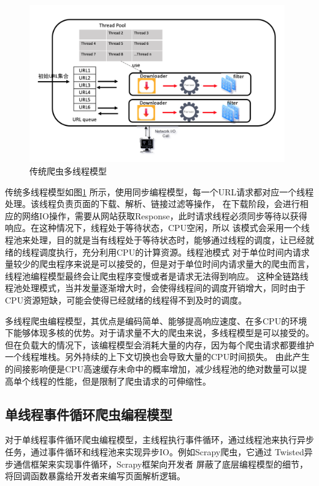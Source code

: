 \documentclass[master]{njuthesis}
\begin{document}
\begin{figure}[htbp]
\centering
\includegraphics[width= 0.98\textwidth]{pic/thread_pool.png}
\caption{传统爬虫多线程模型}\label{fig:threadpool}
\end{figure}
传统多线程模型如图\ref{fig:threadpool} 所示，使用同步编程模型，每一个URL请求都对应一个线程处理\cite{rheinlander2016potential}。该线程负责页面的下载、解析、链接过滤等操作，
在下载阶段，会进行相应的网络IO操作，需要从网站获取Response，此时请求线程必须同步等待以获得响应。在这种情况下，线程处于等待状态，CPU空闲，所以
该模式会采用一个线程池来处理，目的就是当有线程处于等待状态时，能够通过线程的调度，让已经就绪的线程调度执行，充分利用CPU的计算资源。线程池模式
对于单位时间内请求量较少的爬虫程序来说是可以接受的，但是对于单位时间内请求量大的爬虫而言，线程池编程模型最终会让爬虫程序变慢或者是请求无法得到响应。
这种全链路线程池处理模式，当并发量逐渐增大时，会使得线程间的调度开销增大，同时由于CPU资源短缺，可能会使得已经就绪的线程得不到及时的调度。

多线程爬虫编程模型，其优点是编码简单、能够提高响应速度、在多CPU的环境下能够体现多核的优势。对于请求量不大的爬虫来说，多线程模型是可以接受的。
但在负载大的情况下，该编程模型会消耗大量的内存，因为每个爬虫请求都要维护一个线程堆栈。另外持续的上下文切换也会导致大量的CPU时间损失。
由此产生的间接影响便是CPU高速缓存未命中的概率增加，减少线程池的绝对数量可以提高单个线程的性能，但是限制了爬虫请求的可伸缩性。



\subsection{单线程事件循环爬虫编程模型}
对于单线程事件循环爬虫编程模型\cite{singh2014web}，主线程执行事件循环，通过线程池来执行异步任务，通过事件循环和线程池来实现异步IO。例如Scrapy爬虫，它通过
Twisted异步通信框架来实现事件循环，Scrapy框架向开发者
屏蔽了底层编程模型的细节，将回调函数暴露给开发者来编写页面解析逻辑。
\end{document}
